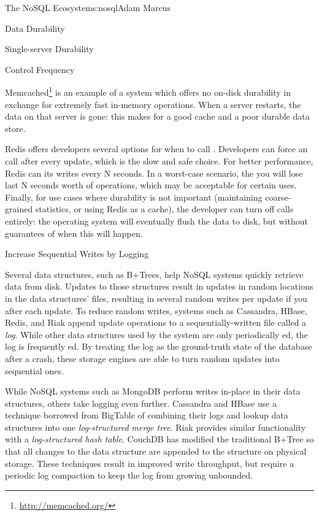 \begin{aosachapter}{The NoSQL Ecosystem}{s:nosql}{Adam Marcus}
\begin{aosasect1}{Data Durability}
\begin{aosasect2}{Single-server Durability}
\begin{aosasect3}{Control  Frequency}

Memcached\footnote{\url{http://memcached.org/}} is an example of a system which offers no on-disk durability
in exchange for extremely fast in-memory operations.  When a server
restarts, the data on that server is gone: this makes for a good cache
and a poor durable data store.

Redis offers developers several options for when to call
. Developers can force an  call after every
update, which is the slow and safe choice.  For better performance,
Redis can  its writes every N seconds.  In a worst-case
scenario, the you will lose last N seconds worth of operations, which
may be acceptable for certain uses.  Finally, for use cases where
durability is not important (maintaining coarse-grained statistics, or
using Redis as a cache), the developer can turn off  calls
entirely: the operating system will eventually flush the data to disk,
but without guarantees of when this will happen.

\end{aosasect3}

\begin{aosasect3}{Increase Sequential Writes by Logging}

Several data structures, such as B+Trees, help NoSQL systems quickly
retrieve data from disk.  Updates to those structures result in
updates in random locations in the data structures' files, resulting
in several random writes per update if you  after each
update.  To reduce random writes, systems such as Cassandra, HBase,
Redis, and Riak append update operations to a sequentially-written
file called a \emph{log}.  While other data structures used by the
system are only periodically ed, the log is frequently
ed.  By treating the log as the ground-truth state of the
database after a crash, these storage engines are able to turn random
updates into sequential ones.

While NoSQL systems such as MongoDB perform writes in-place in their
data structures, others take logging even further.  Cassandra and
HBase use a technique borrowed from BigTable of combining their logs
and lookup data structures into one \emph{log-structured merge tree}.
Riak provides similar functionality with a \emph{log-structured hash
table}.  CouchDB has modified the traditional B+Tree so that all
changes to the data structure are appended to the structure on
physical storage.  These techniques result in improved write
throughput, but require a periodic log compaction to keep the log from
growing unbounded.


\end{aosasect3}
\end{aosasect2}
\end{aosasect1}
\end{aosachapter}
